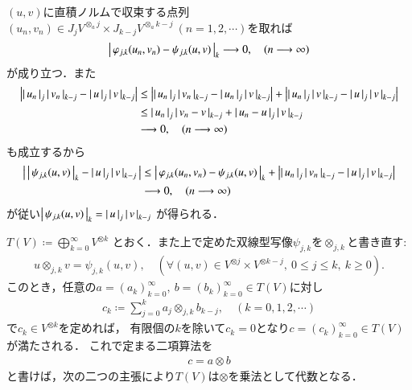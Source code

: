 	\begin{prf}
		$(u,v)$に直積ノルムで収束する点列$(u_n,v_n) \in J_j V^{\otimes_a j} \times J_{k-j} V^{\otimes_a k-j}\ (n=1,2,\cdots)$を取れば
		\begin{align}
			\left|\, \varphi_{j,k}(u_n,v_n) - \psi_{j,k}(u,v)\, \right|_{k} \longrightarrow 0,
			\quad (n \longrightarrow \infty)
		\end{align}
		が成り立つ．また
		\begin{align}
			\left| \left|\, u_n\, \right|_{j} \left|\, v_n\, \right|_{k-j} - 
			\left|\, u\, \right|_{j} \left|\, v\, \right|_{k-j} \right|
			&\leq \left| \left|\, u_n\, \right|_{j} \left|\, v_n\, \right|_{k-j} - 
			\left|\, u_n\, \right|_{j} \left|\, v\, \right|_{k-j} \right| 
			+ \left| \left|\, u_n\, \right|_{j} \left|\, v\, \right|_{k-j} - 
			\left|\, u\, \right|_{j} \left|\, v\, \right|_{k-j} \right| \\
			&\leq \left|\, u_n\, \right|_{j} \left|\, v_n - v\, \right|_{k-j} 
			+ \left|\, u_n - u\, \right|_{j} \left|\, v\, \right|_{k-j} \\
			&\longrightarrow 0, \quad (n \longrightarrow \infty)
		\end{align}
		も成立するから
		\begin{align}
			\left|\, \left|\, \psi_{j,k}(u,v)\, \right|_{k} - \left|\, u\, \right|_{j} \left|\, v\, \right|_{k-j}\, \right|
			&\leq \left|\, \varphi_{j,k}(u_n,v_n) - \psi_{j,k}(u,v)\, \right|_{k}
				+ \left| \left|\, u_n\, \right|_{j} \left|\, v_n\, \right|_{k-j} - 
			\left|\, u\, \right|_{j} \left|\, v\, \right|_{k-j} \right| \\
			& \longrightarrow 0, \quad (n \longrightarrow \infty)
		\end{align}
		が従い$\left|\, \psi_{j,k}(u,v)\, \right|_{k} = \left|\, u\, \right|_{j} \left|\, v\, \right|_{k-j}$
		が得られる．
		\QED
	\end{prf}
	
	$T(V) \coloneqq \bigoplus_{k=0}^{\infty} V^{\otimes k}$
	とおく．また上で定めた双線型写像$\psi_{j,k}$を$\otimes_{j,k}$と書き直す:
	\begin{align}
		u \otimes_{j,k} v = \psi_{j,k}(u,v),
		\quad (\forall (u,v) \in V^{\otimes j} \times V^{\otimes k-j},\ 0 \leq j \leq k,\ k \geq 0).
		\label{eq:def_of_otimes_for_completion_V_tensor_k}
	\end{align}
	このとき，任意の$a=(a_k)_{k=0}^{\infty},\ b=(b_k)_{k=0}^{\infty} \in T(V)$に対し
	\begin{align}
		c_k \coloneqq \sum_{j=0}^{k} a_j \otimes_{j,k} b_{k-j},
		\quad (k=0,1,2,\cdots)
	\end{align}
	で$c_k \in V^{\otimes k}$を定めれば，
	有限個の$k$を除いて$c_k = 0$となり$c = (c_k)_{k=0}^{\infty} \in T(V)$が満たされる．
	これで定まる二項算法を
	\begin{align}
		c = a \otimes b
	\end{align}
	と書けば，次の二つの主張により$T(V)$は$\otimes$を乗法として代数となる．
	
